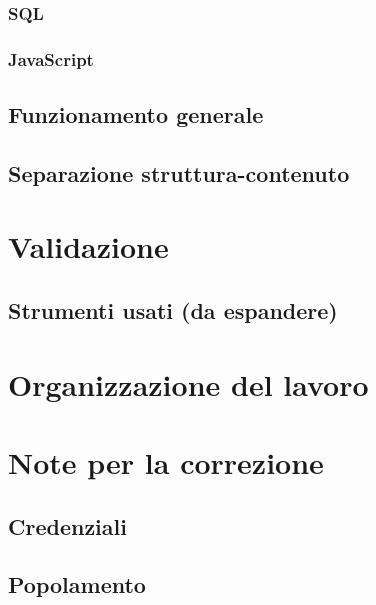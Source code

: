 \documentclass[a4paper, oneside, openany, dvipsnames, table]{article}
\begin{document}
		\subsubsection{SQL}
			
		\subsubsection{JavaScript}
			
	\subsection{Funzionamento generale}
		
	\subsection{Separazione struttura-contenuto}
		
	
\newpage
\section{Validazione}
	
	\subsection{Strumenti usati (da espandere)}
		
	
\newpage
\section{Organizzazione del lavoro}
	
	
\appendix
{}
\newpage
\section{Note per la correzione}
	
	\subsection{Credenziali}
		
	\subsection{Popolamento}
		

\newpage
\end{document}
